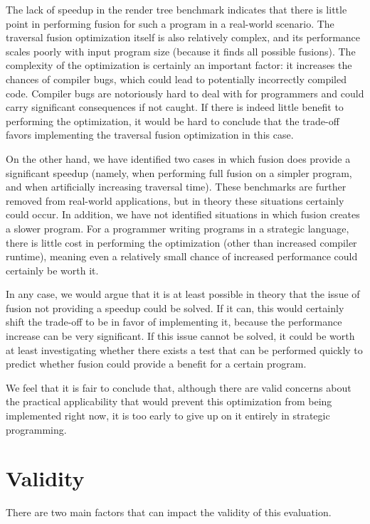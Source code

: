 The lack of speedup in the render tree benchmark indicates that there is little point in performing fusion for such a program in a real-world scenario. The traversal fusion optimization itself is also relatively complex, and its performance scales poorly with input program size (because it finds all possible fusions). The complexity of the optimization is certainly an important factor: it increases the chances of compiler bugs, which could lead to potentially incorrectly compiled code. Compiler bugs are notoriously hard to deal with for programmers and could carry significant consequences if not caught. If there is indeed little benefit to performing the optimization, it would be hard to conclude that the trade-off favors implementing the traversal fusion optimization in this case.

On the other hand, we have identified two cases in which fusion does provide a significant speedup (namely, when performing full fusion on a simpler program, and when artificially increasing traversal time). These benchmarks are further removed from real-world applications, but in theory these situations certainly could occur. In addition, we have not identified situations in which fusion creates a slower program. For a programmer writing programs in a strategic language, there is little cost in performing the optimization (other than increased compiler runtime), meaning even a relatively small chance of increased performance could certainly be worth it.

In any case, we would argue that it is at least possible in theory that the issue of fusion not providing a speedup could be solved. If it can, this would certainly shift the trade-off to be in favor of implementing it, because the performance increase can be very significant. If this issue cannot be solved, it could be worth at least investigating whether there exists a test that can be performed quickly to predict whether fusion could provide a benefit for a certain program.

We feel that it is fair to conclude that, although there are valid concerns about the practical applicability that would prevent this optimization from being implemented right now, it is too early to give up on it entirely in strategic programming.

\section{Validity}
There are two main factors that can impact the validity of this evaluation.

